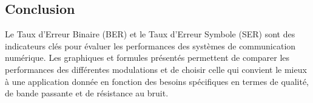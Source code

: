\documentclass[10pt,a4paper]{article}
\begin{document}
\subsection*{Conclusion}
Le Taux d'Erreur Binaire (BER) et le Taux d'Erreur Symbole (SER) sont des indicateurs clés pour évaluer les performances des systèmes de communication numérique. Les graphiques et formules présentés permettent de comparer les performances des différentes modulations et de choisir celle qui convient le mieux à une application donnée en fonction des besoins spécifiques en termes de qualité, de bande passante et de résistance au bruit.
\end{document}
